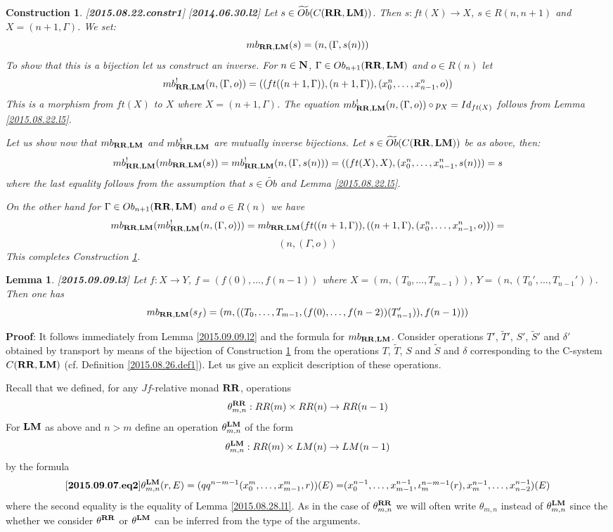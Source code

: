 \documentclass[11pt]{article}
\newenvironment{eq}{\begin{equation}}{\end{equation}}
\newenvironment{proof}{{\bf Proof}:}{\vskip 5mm }
\newtheorem{lemma}[proposition]{Lemma}
\newtheorem{construction}[proposition]{Construction}
\newcommand{\llabel}[1]{\label{#1}[{\bf #1}]}
\newcommand{\sr}{\rightarrow}
\newcommand{\nn}{{\bf N\rm}}
\newcommand{\nat}{\nn}
\newcommand{\wt}{\widetilde}
\newcommand{\RR}{{\bf RR}}
\newcommand{\LM}{{\bf LM}}
\begin{document}
%
\begin{construction}\rm
\llabel{2015.08.22.constr1}
\llabel{2014.06.30.l2}
Let $s\in \wt{Ob}(C(\RR,\LM))$. Then $s:ft(X)\sr X$, $s\in R(n,n+1)$ and $X=(n+1,\Gamma)$. We set:
%
$$mb_{\RR,\LM}(s)=(n,(\Gamma, s(n)))$$
%
To show that this is a bijection let us construct an inverse. For $n\in\nat$, $\Gamma\in Ob_{n+1}(\RR,\LM)$ and $o\in R(n)$ let
%
$$mb_{\RR,\LM}^!(n,(\Gamma,o))=((ft((n+1,\Gamma)),(n+1,\Gamma)),(x^{n}_0,\dots,x^{n}_{n-1},o))$$
%
This is a morphism from $ft(X)$ to $X$ where $X=(n+1,\Gamma)$. The equation $mb_{\RR,\LM}^!(n,(\Gamma,o))\circ p_X=Id_{ft(X)}$ follows from Lemma \ref{2015.08.22.l5}. 

Let us show now that $mb_{\RR,\LM}$ and $mb_{\RR,\LM}^!$ are mutually inverse bijections. Let $s\in \wt{Ob}(C(\RR,\LM))$ be as above, then:
%
$$mb_{\RR,\LM}^!(mb_{\RR,\LM}(s))=mb_{\RR,\LM}^!(n,(\Gamma,s(n)))=((ft(X),X),(x^{n}_0,\dots,x^{n}_{n-1},s(n)))=s$$
%
where the last equality follows from the assumption that $s\in \wt{Ob}$ and Lemma \ref{2015.08.22.l5}.

On the other hand for $\Gamma\in Ob_{n+1}(\RR,\LM)$ and $o\in R(n)$ we have
%
$$mb_{\RR,\LM}(mb_{\RR,\LM}^!(n,(\Gamma,o)))=mb_{\RR,\LM}(ft((n+1,\Gamma)),((n+1,\Gamma),(x^{n}_0,\dots,x^{n}_{n-1},o)))=$$
$$(n,(\Gamma,o))$$
%
This completes Construction \ref{2015.08.22.constr1}.
\end{construction}
%
\begin{lemma}
\llabel{2015.09.09.l3}
Let $f:X\sr Y$, $f=(f(0),\dots,f(n-1))$ where $X=(m,(T_0,\dots,T_{m-1}))$, $Y=(n,(T_0',\dots,T_{n-1}'))$. Then one has
%
$$mb_{\RR,\LM}(s_f)=(m,((T_0,\dots,T_{m-1},(f(0),\dots,f(n-2))(T_{n-1}')), f(n-1)))$$
%
\end{lemma}
%
\begin{proof}
It follows immediately from Lemma \ref{2015.09.09.l2} and the formula for $mb_{\RR,\LM}$.
\end{proof}
%
Consider operations $T'$, $\wt{T}'$, $S'$, $\wt{S}'$ and $\delta'$ obtained by transport by means of the bijection of Construction \ref{2015.08.22.constr1} from the operations $T$, $\wt{T}$, $S$ and $\wt{S}$ and $\delta$ corresponding to the C-system $C(\RR,\LM)$ (cf. Definition \ref{2015.08.26.def1}).  Let us give an explicit description of these operations. 

Recall that we defined, for any $Jf$-relative monad $\RR$, operations 
%
$$\theta^{\RR}_{m,n}:RR(m)\times RR(n)\sr RR(n-1)$$
% 
For $\LM$ as above and $n>m$ define an operation $\theta^{\LM}_{m,n}$ of the form
%
$$\theta^{\LM}_{m,n}:RR(m)\times LM(n)\sr LM(n-1)$$
%
by the formula
%
\begin{eq}\llabel{2015.09.07.eq2}
\theta^{\LM}_{m,n}(r,E)=(qq^{n-m-1}(x_0^m,\dots,x_{m-1}^m,r))(E)=$$
$$(x_0^{n-1},\dots,x_{m-1}^{n-1},\iota_m^{n-m-1}(r),x_m^{n-1},\dots, x_{n-2}^{n-1})(E)
\end{eq}
%
where the second equality is the equality of Lemma \ref{2015.08.28.l1}. As in the case of $\theta^{\RR}_{m,n}$ we will often write $\theta_{m,n}$ instead of $\theta^{\LM}_{m,n}$ since the whether we consider $\theta^{\RR}$ or $\theta^{\LM}$ can be inferred from the type of the arguments. 
\end{document}
